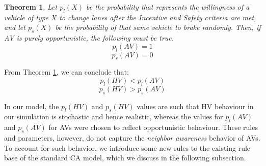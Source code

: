 \documentclass[oneside,letter,11pt]{article}
\newtheorem{theorem}{Theorem}
\begin{document}
\begin{theorem}
\label{opp}
Let $p_l(X)$ be the probability that represents the willingness of a vehicle of type $X$ to change lanes after the Incentive and Safety criteria are met, and let $p_s(X)$ be the probability of that same vehicle to brake randomly. Then, if AV is purely opportunistic, the following must be true.
\[ p_l(AV) = 1 \]
\[ p_s(AV) = 0 \]
\end{theorem}

From Theorem \ref{opp}, we can conclude that:
\begin{equation}
    p_{l}(HV) < p_{l}(AV)
\end{equation}
\begin{equation}
    p_{s}(HV) > p_{s}(AV)
\end{equation}
 
 In our model, the $p_{l}(HV)$ and $p_{s}(HV)$ values are such that HV behaviour in our simulation is stochastic and hence realistic, whereas the values for $p_{l}(AV)$ and $p_{s}(AV)$ for AVs were chosen to reflect opportunistic behaviour. These rules and parameters, however, do not capture the \textit{neighbor awareness} behavior of AVs. To account for such behavior, we introduce some new rules to the existing rule base of the standard CA model, which we discuss in the following subsection. 
\end{document}
